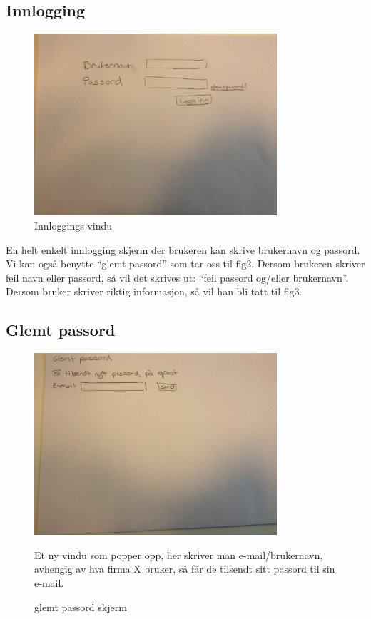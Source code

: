 \subsection{Innlogging}
\begin{figure}[ht!]
\includegraphics[width=90mm]{fig1.jpg}
\caption{Innloggings vindu}
\end{figure}
En helt enkelt innlogging skjerm der brukeren kan skrive brukernavn og passord. Vi kan også benytte “glemt passord” som tar oss til fig2. Dersom brukeren skriver feil navn eller passord, så vil det skrives ut: “feil passord og/eller brukernavn”. Dersom bruker skriver riktig informasjon, så vil han bli tatt til fig3.
\newpage

\subsection{Glemt passord}
\begin{figure}[ht!]
\includegraphics[width=90mm]{fig2.jpg}
\caption{glemt passord skjerm}
Et ny vindu som popper opp, her skriver man e-mail/brukernavn, avhengig av hva firma X bruker, så får de tilsendt sitt passord til sin e-mail.
\end{figure}

\newpage

